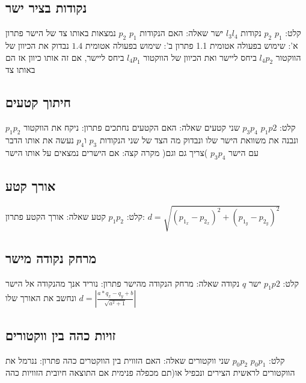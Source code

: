 \documentclass{article}
\makeatletter
\newcommand\abs[1]{\left|#1\right|}
\newcommand*{\saved@uline}{}
\let\saved@uline\uline
\newcommand*{\mathuline}{%
  \mathpalette{\math@uline\saved@uline}%
}
\newcommand*{\math@uline}[3]{%
  \mbox{#1{$#2#3\m@th$}}%
}
\renewcommand*{\uline}{%
  \relax  
  \ifmmode
    \expandafter\mathuline
  \else
    \expandafter\saved@uline
  \fi
}
\makeatother
\begin{document}
\subsection{נקודות בציר ישר}
\noindent \uline{קלט:} $p_1$ $p_2$ נקודות $l_3l_4$ ישר
\newline \uline{שאלה:} האם הנקודות $p_1$ $p_2$ נמצאות באותו צד של הישר 
\newline \uline{פתרון א':} שימוש בפעולה אטומית 1.1
\newline \uline{פתרון ב':} שימוש בפעולה אטומית $1.4$ נבדוק את הכיוון של הווקטור $l_4p_2$ ביחס ליישר ואת הכיוון של הווקטור $l_4p_1$ ביחס ליישר, אם זה אותו כיוון אז הם באותו צד

\subsection{חיתוך קטעים}
\noindent \uline{קלט:} $p_1p2$ $p_3p_4$ שני קטעים
\newline \uline{שאלה:} האם הקטעים נחתכים
\newline \uline{פתרון:} ניקח את הווקטור  $p_1p_2$ ונבנה את משוואת הישר שלו ונבדוק מה הצד של שני הנקודות $p_3$ ו$p_4$ נעשה את אותו הדבר עם הישר $p_3p_4$ )צריך גם וגם( 
\newline \uline{מקרה קצה:} אם הישרים נמצאים על אותו הישר 



\subsection{אורך קטע}
\noindent \uline{קלט:} $p_1p_2$  קטע
\newline \uline{שאלה:} אורך הקטע
\newline \uline{פתרון:} $d= \sqrt{(p_{1_x}-p_{2_x})^2+(p_{1_y}-p_{2_y})^2}$ 

\subsection{מרחק נקודה מישר}
\noindent \uline{קלט:} $p_1p2$  ישר $q$ נקודה
\newline \uline{שאלה:} מרחק הנקודה מהישר
\newline \uline{פתרון:} נוריד אנך מהנקודה אל הישר ונחשב את האורך שלו  $d=\abs{\frac{a*q_x-q_y+b}{ \sqrt{a^2+1}}}$

\subsection{זויות כהה בין ווקטורים}
\noindent \uline{קלט:} $p_0p_1$ $p_0p_2$ שני ווקטורים
\newline \uline{שאלה:} האם הזווית בין הווקטרים כהה
\newline \uline{פתרון:} ננרמל את הווקטורים לראשית הצירים ונכפיל או(תם מכפלה פנימית אם התוצאה חיובית הזוויות כהה
\end{document}
